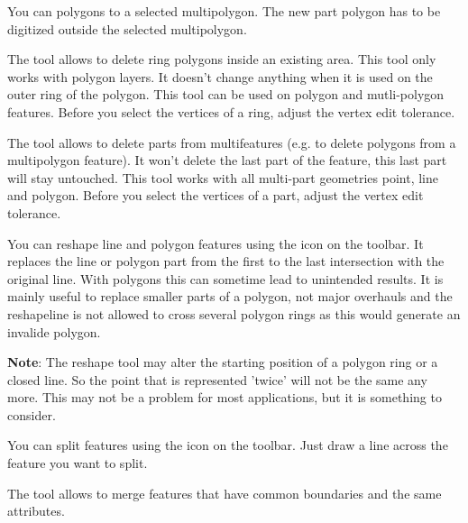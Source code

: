 You can  polygons to a selected multipolygon. 
The new part polygon has to be digitized outside the selected multipolygon.


The  tool allows to delete ring
polygons inside an existing area. This tool only works with polygon layers. 
It doesn't change anything when it is used on the outer ring of the polygon. 
This tool can be used on polygon and mutli-polygon features. Before
you select the vertices of a ring, adjust the vertex edit tolerance.


The  tool allows to delete parts
from multifeatures (e.g. to delete polygons from a multipolygon feature). It 
won't delete the last part of the feature, this last part will stay untouched. 
This tool works with all multi-part geometries point, line and polygon. Before 
you select the vertices of a part, adjust the vertex edit tolerance. 


You can reshape line and polygon features using the 
 icon on the toolbar. It
replaces the line or polygon part from the first to the last intersection 
with the original line. With polygons this can sometime lead to unintended 
results. It is mainly useful to replace smaller parts of a polygon, not major 
overhauls and the reshapeline is not allowed to cross several polygon rings
as this would generate an invalide polygon.

\textbf{Note}: The reshape tool may alter the starting position of a polygon
ring or a closed line. So the point that is represented 'twice' will not be
the same any more. This may not be a problem for most applications, but it is
something to consider.


You can split features using the  icon on the toolbar. Just draw a line across the feature you 
want to split.


The  tool allows to
merge features that have common boundaries and the same attributes.  

